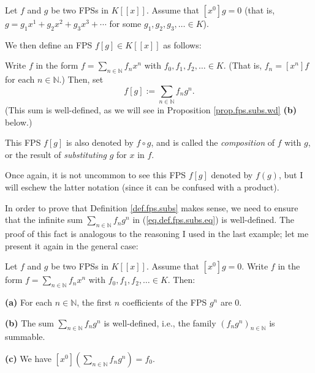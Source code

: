 \begin{definition}
\label{def.fps.subs}Let $f$ and $g$ be two FPSs in $K\left[  \left[  x\right]
\right]  $. Assume that $\left[  x^{0}\right]  g=0$ (that is, $g=g_{1}%
x^{1}+g_{2}x^{2}+g_{3}x^{3}+\cdots$ for some $g_{1},g_{2},g_{3},\ldots\in K$).

We then define an FPS $f\left[  g\right]  \in K\left[  \left[  x\right]
\right]  $ as follows:

Write $f$ in the form $f=\sum_{n\in\mathbb{N}}f_{n}x^{n}$ with $f_{0}%
,f_{1},f_{2},\ldots\in K$. (That is, $f_{n}=\left[  x^{n}\right]  f$ for each
$n\in\mathbb{N}$.) Then, set%
\begin{equation}
f\left[  g\right]  :=\sum_{n\in\mathbb{N}}f_{n}g^{n}.
\label{eq.def.fps.subs.eq}%
\end{equation}
(This sum is well-defined, as we will see in Proposition
\ref{prop.fps.subs.wd} \textbf{(b)} below.)

This FPS $f\left[  g\right]  $ is also denoted by $f\circ g$, and is called
the \emph{composition} of $f$ with $g$, or the result of \emph{substituting}
$g$ for $x$ in $f$.
\end{definition}

Once again, it is not uncommon to see this FPS $f\left[  g\right]  $ denoted
by $f\left(  g\right)  $, but I will eschew the latter notation (since it can
be confused with a product).

In order to prove that Definition \ref{def.fps.subs} makes sense, we need to
ensure that the infinite sum $\sum_{n\in\mathbb{N}}f_{n}g^{n}$ in
(\ref{eq.def.fps.subs.eq}) is well-defined. The proof of this fact is
analogous to the reasoning I used in the last example; let me present it again
in the general case:

\begin{proposition}
\label{prop.fps.subs.wd}Let $f$ and $g$ be two FPSs in $K\left[  \left[
x\right]  \right]  $. Assume that $\left[  x^{0}\right]  g=0$. Write $f$ in
the form $f=\sum_{n\in\mathbb{N}}f_{n}x^{n}$ with $f_{0},f_{1},f_{2},\ldots\in
K$. Then: \medskip

\textbf{(a)} For each $n\in\mathbb{N}$, the first $n$ coefficients of the FPS
$g^{n}$ are $0$. \medskip

\textbf{(b)} The sum $\sum_{n\in\mathbb{N}}f_{n}g^{n}$ is well-defined, i.e.,
the family $\left(  f_{n}g^{n}\right)  _{n\in\mathbb{N}}$ is summable.
\medskip

\textbf{(c)} We have $\left[  x^{0}\right]  \left(  \sum_{n\in\mathbb{N}}%
f_{n}g^{n}\right)  =f_{0}$.
\end{proposition}

